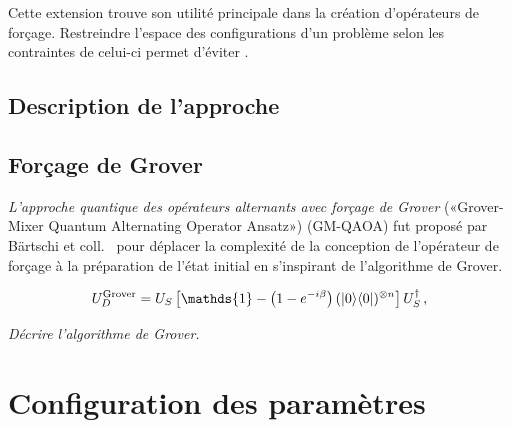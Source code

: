 Cette extension trouve son utilité principale dans la création d'opérateurs de forçage. Restreindre l'espace des configurations d'un problème selon les contraintes de celui-ci permet d'éviter .



\subsection{Description de l'approche}





\subsection{Forçage de Grover}

\textit{L'approche quantique des opérateurs alternants avec forçage de Grover} («Grover-Mixer Quantum Alternating Operator Ansatz») (GM-QAOA) fut proposé par Bärtschi et coll.~\cite{bartschiGroverMixersQAOA2020} pour déplacer la complexité de la conception de l'opérateur de forçage à la préparation de l'état initial en s'inspirant de l'algorithme de Grover. 



\begin{equation}
    U_D^{\mathrm{Grover}} = U_{S}\left[ \mathds{1} -\left(1-e^{-i \beta}\right) (\ket{0}\!\bra{0})^{\otimes n} \right] U_{S}^{\dagger} \,,
\end{equation}

\textcolor{mydarkred}{\textit{Décrire l'algorithme de Grover.}}



\section{Configuration des paramètres}
\label{subsec:initialisation-parametres}

